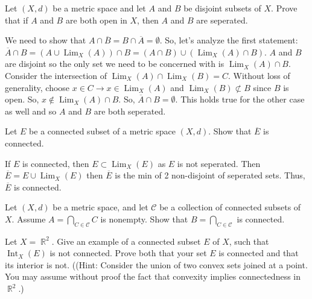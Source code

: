\documentclass[12pt,letterpaper,boxed]{hmcpset}
\DeclareMathOperator{\Lim}{Lim}
\DeclareMathOperator{\Int}{Int}
\DeclareMathOperator{\R}{\mathbb{R}}
\begin{document}
\begin{problem}[Exercise 5.7]
Let $(X, d)$ be a metric space and let $A$ and $B$ be disjoint subsets of $X$. Prove that if $A$ and $B$ are both open in $X$, then $A$ and $B$ are seperated.
\end{problem}

\begin{solution}
We need to show that $A \cap \overline{B} = B \cap \overline{A} = \emptyset.$ So, let's analyze the first statement: $\overline{A}\cap B = (A \cup \Lim_{X}(A))\cap B = (A \cap B)\cup(\Lim_{X}(A) \cap B).$ $A$ and $B$ are disjoint so the only set we need to be concerned with is $\Lim_{X}(A) \cap B$. Consider the intersection of $\Lim_X(A)\cap \Lim_X(B) = C.$ Without loss of generality, choose $x \in C \rightarrow x \in \Lim_X(A)$ and $\Lim_X(B)\not \subset B$ since $B$ is open. So, $x \notin \Lim_X(A)\cap B.$ So, $\overline{A}\cap B = \emptyset$. This holds true for the other case as well and so $A$ and $B$ are both seperated.  
\end{solution}

\begin{problem}[Exercise 5.8]
Let $E$ be a connected subset of a metric space $(X, d)$. Show that $\overline{E}$ is connected.
\end{problem}

\begin{solution}
If $E$ is connected, then $E \subset \Lim_X (E)$ as $E$ is not seperated. Then $\overline{E}=E\cup \Lim_X(E)$ then $\overline{E}$ is the min of 2 non-disjoint of seperated sets. Thus, $\overline{E}$ is connected. 
\end{solution}

\begin{problem}[Exercise 5.12]
Let $(X,d)$ be a metric space, and let $\mathcal{C}$ be a collection of connected subsets of $X$. Assume $A = \bigcap_{C \in \mathcal{C}} C$ is nonempty. Show that $B = \bigcap_{C \in \mathcal{C}}$ is connected.
\end{problem}

\begin{solution}
 
\end{solution}

\begin{problem}[Exercise 5.13]
Let $X = \R^{2}$. Give an example of a connected subset $E$ of $X$, such that $\Int_X(E)$ is not connected. Prove both that your set $E$ is connected and that its interior is not. ((Hint: Consider the
union of two convex sets joined at a point. You may assume without proof the fact that convexity implies
connectedness in $\R^{2}$.)
\end{problem}

\begin{solution}
 
\end{solution}
\end{document}
